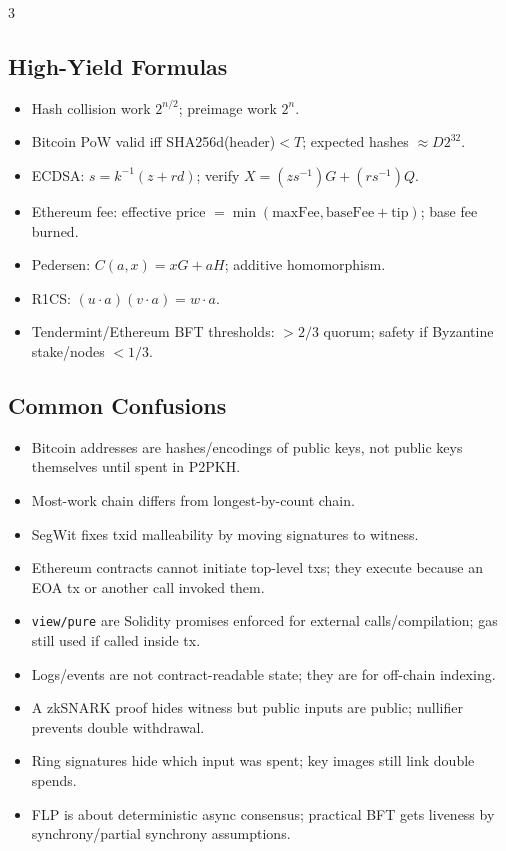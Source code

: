 \documentclass[8pt]{extarticle}
\begin{document}
\begin{multicols*}{3}
\subsection{High-Yield Formulas}
\begin{itemize}
\item Hash collision work $2^{n/2}$; preimage work $2^n$.
\item Bitcoin PoW valid iff SHA256d(header)$<T$; expected hashes $\approx D2^{32}$.
\item ECDSA: $s=k^{-1}(z+rd)$; verify $X=(zs^{-1})G+(rs^{-1})Q$.
\item Ethereum fee: effective price $=\min(\mathrm{maxFee},\mathrm{baseFee}+\mathrm{tip})$; base fee burned.
\item Pedersen: $C(a,x)=xG+aH$; additive homomorphism.
\item R1CS: $(u\cdot a)(v\cdot a)=w\cdot a$.
\item Tendermint/Ethereum BFT thresholds: $>2/3$ quorum; safety if Byzantine stake/nodes $<1/3$.
\end{itemize}

\subsection{Common Confusions}
\begin{itemize}
\item Bitcoin addresses are hashes/encodings of public keys, not public keys themselves until spent in P2PKH.
\item Most-work chain differs from longest-by-count chain.
\item SegWit fixes txid malleability by moving signatures to witness.
\item Ethereum contracts cannot initiate top-level txs; they execute because an EOA tx or another call invoked them.
\item \texttt{view/pure} are Solidity promises enforced for external calls/compilation; gas still used if called inside tx.
\item Logs/events are not contract-readable state; they are for off-chain indexing.
\item A zkSNARK proof hides witness but public inputs are public; nullifier prevents double withdrawal.
\item Ring signatures hide which input was spent; key images still link double spends.
\item FLP is about deterministic async consensus; practical BFT gets liveness by synchrony/partial synchrony assumptions.
\end{itemize}


\end{multicols*}
\end{document}
